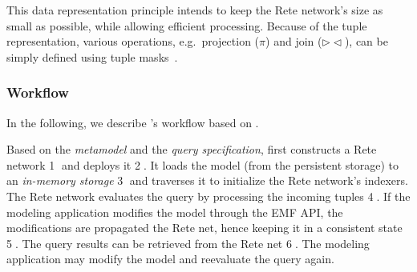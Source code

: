 This data representation principle intends to keep the Rete network's size as small as possible, while allowing efficient processing. Because of the tuple representation, various operations, e.g.\ projection ($ \pi $) and join ($ \rhd\!\!\lhd $), can be simply defined using tuple masks~\cite{BergmannMasters}.

\subsubsection{Workflow}


In the following, we describe \eiq{}'s workflow based on . 

Based on the \emph{metamodel} and the \emph{query specification}, \iqd{} first constructs a Rete network \textcircled{1} and deploys it \textcircled{2}. It loads the model (from the persistent storage) to an \emph{in-memory storage} \textcircled{3} and traverses it to initialize the Rete network's indexers. The Rete network evaluates the query by processing the incoming tuples \textcircled{4}. If the modeling application modifies the model through the EMF API, the modifications are propagated the Rete net, hence keeping it in a consistent state \textcircled{5}. The query results can be retrieved from the Rete net \textcircled{6}. The modeling application may modify the model and reevaluate the query again.
